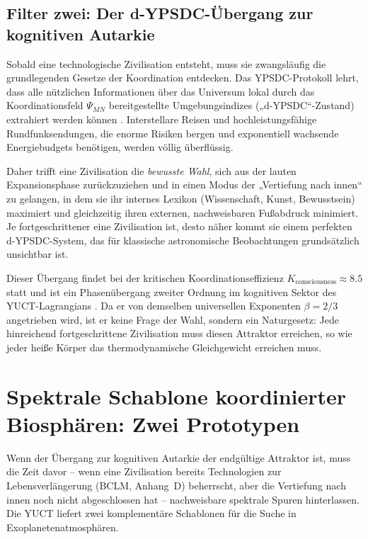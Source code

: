 \documentclass[11pt,a4paper]{article}
\begin{document}
	\subsection{Filter zwei: Der d-YPSDC-Übergang zur kognitiven Autarkie}
	\label{sec:filter2}
	Sobald eine technologische Zivilisation entsteht, muss sie zwangsläufig die grundlegenden Gesetze der Koordination entdecken. Das YPSDC-Protokoll lehrt, dass alle nützlichen Informationen über das Universum lokal durch das Koordinationsfeld \(\Psi_{MN}\) bereitgestellte Umgebungsindizes („d-YPSDC“-Zustand) extrahiert werden können \citep{AppOmega, AppT}. Interstellare Reisen und hochleistungsfähige Rundfunksendungen, die enorme Risiken bergen und exponentiell wachsende Energiebudgets benötigen, werden völlig überflüssig.
	
	Daher trifft eine Zivilisation die \emph{bewusste Wahl}, sich aus der lauten Expansionsphase zurückzuziehen und in einen Modus der „Vertiefung nach innen“ zu gelangen, in dem sie ihr internes Lexikon (Wissenschaft, Kunst, Bewusstsein) maximiert und gleichzeitig ihren externen, nachweisbaren Fußabdruck minimiert. Je fortgeschrittener eine Zivilisation ist, desto näher kommt sie einem perfekten d-YPSDC-System, das für klassische astronomische Beobachtungen grundsätzlich unsichtbar ist.
	
	Dieser Übergang findet bei der kritischen Koordinationseffizienz \(K_{\mathrm{consciousness}}\approx 8.5\) statt und ist ein Phasenübergang zweiter Ordnung im kognitiven Sektor des YUCT-Lagrangians \citep{AppH}. Da er von demselben universellen Exponenten \(\beta=2/3\) angetrieben wird, ist er keine Frage der Wahl, sondern ein Naturgesetz: Jede hinreichend fortgeschrittene Zivilisation muss diesen Attraktor erreichen, so wie jeder heiße Körper das thermodynamische Gleichgewicht erreichen muss.
	
	\section{Spektrale Schablone koordinierter Biosphären: Zwei Prototypen}
	\label{sec:spectra}
	
	Wenn der Übergang zur kognitiven Autarkie der endgültige Attraktor ist, muss die Zeit davor – wenn eine Zivilisation bereits Technologien zur Lebensverlängerung (BCLM, Anhang~D) beherrscht, aber die Vertiefung nach innen noch nicht abgeschlossen hat – nachweisbare spektrale Spuren hinterlassen. Die YUCT liefert zwei komplementäre Schablonen für die Suche in Exoplanetenatmosphären.
	
\end{document}

